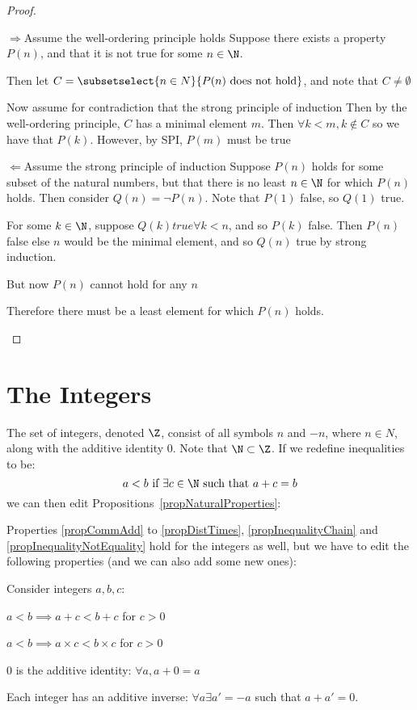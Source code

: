 \documentclass[../Main.tex]{subfiles}
\begin{document}
\begin{proof}
    \begin{proofdirection}{$\Rightarrow$}{Assume the well-ordering principle holds}
        Suppose there exists a property $P(n)$, and that it is not true for some $n \in \N$.\par
        Then let $C = \subsetselect{n \in N}{P(n) \text{ does not hold}}$, and note that $C \neq \emptyset$\par %
        Now assume for contradiction that the strong principle of induction
        Then by the well-ordering principle, $C$ has a minimal element $m$. Then $\forall k < m, k \notin C$ so we have that $P(k)$. However, by SPI, $P(m)$ must be true \contradiction
    \end{proofdirection}
    \begin{proofdirection}{$\Leftarrow$}{Assume the strong principle of induction}
        Suppose $P(n)$ holds for some subset of the natural numbers, but that there is no least $n \in \N$ for which $P(n)$ holds. Then consider $Q(n) =\lnot P(n)$. Note that $P(1)$ false, so $Q(1)$ true.\par
        For some $k \in \N$, suppose $Q(k) true \forall k < n$, and so $P(k)$ false. Then $P(n)$ false else $n$ would be the minimal element, and so $Q(n)$ true by strong induction.\par
        But now $P(n)$ cannot hold for any $n$ \contradiction\par
        Therefore there must be a least element for which $P(n)$ holds.
    \end{proofdirection}
\end{proof}
\section{The Integers}
The set of integers, denoted $\Z$, consist of all symbols $n$ and $-n$, where $n \in N$, along with the additive identity $0$. Note that $\N \subset \Z$. If we redefine inequalities to be:
\begin{equation*}
    a < b \text{ if } \exists c \in \N \text{ such that } a + c = b
\end{equation*}
we can then edit Propositions~\ref{propNaturalProperties}:\par
Properties \ref{propCommAdd} to \ref{propDistTimes}, \ref{propInequalityChain} and \ref{propInequalityNotEquality} hold for the integers as well, but we have to edit the following properties (and we can also add some new ones):
\begin{propositions}{
        Consider integers $a, b, c$:
        \label{propIntegerProperties}
    }
    \setcounter{subtheorem}{5} %
    \item $a < b \implies a + c < b + c$ for $c > 0$
    \item $a < b \implies a \times c < b \times c$ for $c > 0$
    \setcounter{subtheorem}{9} %
    \item 0 is the additive identity: $\forall a, a + 0 = a$
    \item Each integer has an additive inverse: $\forall a \exists a' = -a$ such that $a + a' = 0$.
\end{propositions}
\end{document}

